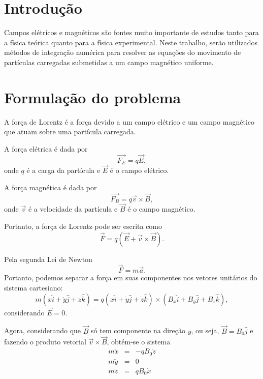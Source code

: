 \documentclass[brazilian, 12pt, a4paper, final]{article}
\begin{document}
\begin{multicols*}{2}
\section{Introdução}
Campos elétricos e magnéticos são fontes muito importante de estudos tanto para a física teórica quanto para a física experimental. Neste trabalho, serão utilizados métodos de integração numérica para resolver as equações do movimento de partículas carregadas submetidas a um campo magnético uniforme.

\section{Formulação do problema}
A força de Lorentz é a força devido a um campo elétrico e um campo magnético que atuam sobre uma partícula carregada. 

A força elétrica é dada por
\begin{equation}
	\vec{F_{E}}=q\vec{E},
\end{equation}
onde $q$ é a carga da partícula e $\vec{E}$ é o campo elétrico.

A força magnética é dada por
\begin{equation}
	\vec{F_{B}}=q\vec{v}\times\vec{B}, 
\end{equation}
onde $\vec{v}$ é a velocidade da partícula e $\vec{B}$ é o campo magnético.

Portanto, a força de Lorentz pode ser escrita como
\begin{equation}
	\vec{F}=q(\vec{E}+\vec{v}\times\vec{B}).
\end{equation}

Pela segunda Lei de Newton
\begin{equation}
	\vec{F}=m\vec{a}.
\end{equation}
Portanto, podemos separar a força em suas componentes nos vetores unitários do sistema cartesiano:
\begin{equation}
	m(\ddot{x}\hat{i}+\ddot{y}\hat{j}+\ddot{z}\hat{k})=
	q(\dot{x}\hat{i}+\dot{y}\hat{j}+\dot{z}\hat{k})\times(B_x\hat{i}+B_y\hat{j}+B_z\hat{k}),
\end{equation}
considerando $\vec{E}=0$.

Agora, considerando que $\vec{B}$ só tem componente na direção $y$, ou seja, $\vec{B}=B_0 \hat{j}$ e fazendo o produto vetorial $\vec{v}\times\vec{B}$, obtém-se o sistema
\begin{eqnarray}
	m\ddot{x}&=&-qB_0\dot{z} \\
	m\ddot{y}&=&0 \\
	m\ddot{z}&=&qB_0\dot{x}
\end{eqnarray}


\end{multicols*}
\end{document}
